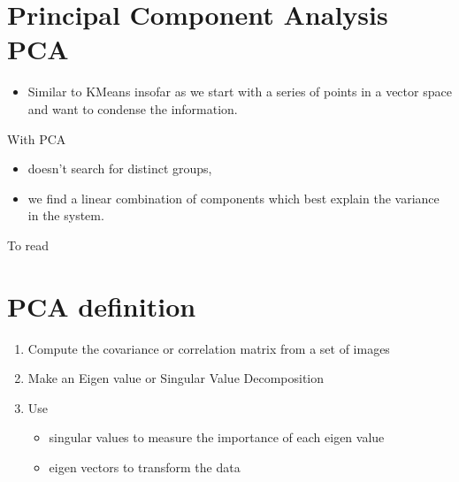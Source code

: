 \documentclass[letterpaper,10pt,english]{sphinxmanual}
\begin{document}
\section{Principal Component Analysis \sphinxhyphen{} PCA}
\label{\detokenize{06-ShapeAnalysis:principal-component-analysis-pca}}\begin{itemize}
\item {} 
\sphinxAtStartPar
Similar to K\sphinxhyphen{}Means insofar as we start with a series of points in a vector space and want to condense the information.

\end{itemize}

\sphinxAtStartPar
With PCA
\begin{itemize}
\item {} 
\sphinxAtStartPar
doesn’t search for distinct groups,

\item {} 
\sphinxAtStartPar
we find a linear combination of components which best explain the variance in the system.

\end{itemize}

\sphinxAtStartPar
To read


\section{PCA definition}
\label{\detokenize{06-ShapeAnalysis:pca-definition}}\begin{enumerate}
%
\item {} 
\sphinxAtStartPar
Compute the covariance or correlation matrix from a set of images

\item {} 
\sphinxAtStartPar
Make an Eigen value or Singular Value Decomposition

\item {} 
\sphinxAtStartPar
Use
\begin{itemize}
\item {} 
\sphinxAtStartPar
singular values to measure the importance of each eigen value

\item {} 
\sphinxAtStartPar
eigen vectors to transform the data

\end{itemize}

\end{enumerate}
\end{document}
